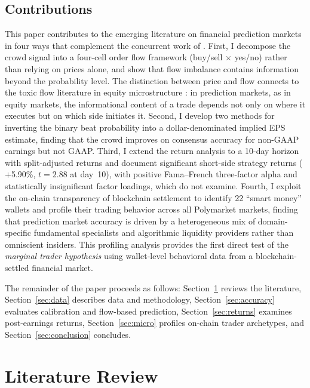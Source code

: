 \documentclass[11pt]{article}
\begin{document}
\subsection*{Contributions}

This paper contributes to the emerging literature on financial prediction markets in four ways that complement the concurrent work of \citet{gomezcram2025financial}. First, I decompose the crowd signal into a four-cell order flow framework (buy/sell $\times$ yes/no) rather than relying on prices alone, and show that flow imbalance contains information beyond the probability level. The distinction between price and flow connects to the toxic flow literature in equity microstructure \citep{easley1987price, kyle1985continuous}: in prediction markets, as in equity markets, the informational content of a trade depends not only on where it executes but on which side initiates it. Second, I develop two methods for inverting the binary beat probability into a dollar-denominated implied EPS estimate, finding that the crowd improves on consensus accuracy for non-GAAP earnings but not GAAP. Third, I extend the return analysis to a 10-day horizon with split-adjusted returns and document significant short-side strategy returns ($+$5.90\%, $t = 2.88$ at day~10), with positive Fama--French three-factor alpha and statistically insignificant factor loadings, which \citet{gomezcram2025financial} do not examine. Fourth, I exploit the on-chain transparency of blockchain settlement to identify 22 ``smart money'' wallets and profile their trading behavior across all Polymarket markets, finding that prediction market accuracy is driven by a heterogeneous mix of domain-specific fundamental specialists and algorithmic liquidity providers rather than omniscient insiders. This profiling analysis provides the first direct test of the \textit{marginal trader hypothesis} \citep{forsythe1992anatomy} using wallet-level behavioral data from a blockchain-settled financial market.

The remainder of the paper proceeds as follows: Section~\ref{sec:lit} reviews the literature, Section~\ref{sec:data} describes data and methodology, Section~\ref{sec:accuracy} evaluates calibration and flow-based prediction, Section~\ref{sec:returns} examines post-earnings returns, Section~\ref{sec:micro} profiles on-chain trader archetypes, and Section~\ref{sec:conclusion} concludes.

\section{Literature Review} \label{sec:lit}
\end{document}

